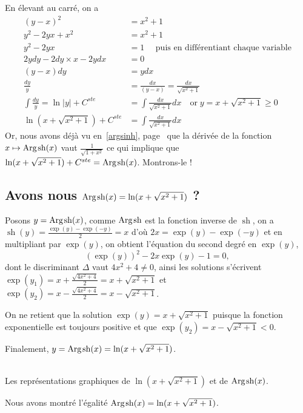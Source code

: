 \documentclass[a4paper,12pt]{report}
\renewcommand{\sinh}{\mathop{\mathrm{sh}}}
\renewcommand{\arg}{\mathop{\mathrm{Arg}}}
\begin{document}
En élevant au carré, on a 
\begin{align*}
(y-x)^2 & = x^2 + 1 \\
y^2 - 2yx + x^2 & = x^2 + 1 \\
y^2 - 2yx  & = 1 \quad \textrm{ puis en différentiant chaque variable} \\
2ydy - 2dy \times x - 2ydx & = 0 \\
(y-x)dy & = ydx \\
\frac{dy}{y} & = \frac{dx}{(y-x)} = \frac{dx}{\sqrt{x^2+1} } \\
\int \frac{dy}{y} = \ln|y| + C^{ste} & = \int \frac{dx}{\sqrt{x^2+1} } dx \quad \textrm{or} \; y = x + \sqrt{x^2+1}  \geqslant 0 \\
\ln(x + \sqrt{x^2+1}) + C^{ste} & = \int \frac{dx}{\sqrt{x^2+1} } dx  
\end{align*}
Or, nous avons déjà vu en~\ref{argsinh}, page~\pageref{argsinh} que la dérivée de la fonction  $x \mapsto \arg\mspace{-1mu}\sinh(x)$  vaut $ \frac{1}{ \sqrt{1+x^2}}$ ce qui implique que $\ln(x + \sqrt{x^2+1}) + C^{ste} = \arg\mspace{-1mu}\sinh\nolimits(x) $. Montrons-le !

\subsection{Avons nous $\arg\mspace{-1mu}\sinh\nolimits(x) = \ln(x + \sqrt{x^2+1}) $ ?}

Posons $ y = \arg\mspace{-1mu}\sinh\nolimits(x) $, comme $ \arg\mspace{-1mu}\sinh\nolimits $ est la fonction inverse de $\sinh$, on a $\sinh(y) = \frac{\exp(y) - \exp(-y)}{2} = x$ d'où $2x = \exp(y) - \exp(-y) $ et en multipliant par $\exp(y)$, on obtient l'équation du second degré en $\exp(y)$,
\begin{equation}
\left(\exp(y) \right)^2 - 2x \exp(y) -1 = 0, 
\end{equation}
dont le discriminant $\Delta$ vaut $4x^2 + 4 \neq 0$, ainsi les solutions s'écrivent $ \exp(y_1) = x + \frac{\sqrt{4x^2 + 4}}{2} = x + \sqrt{x^2+1}$ et $ \exp(y_2) = x - \frac{\sqrt{4x^2 + 4}}{2} = x - \sqrt{x^2+1}$. 

On ne retient que la solution $ \exp(y) = x + \sqrt{x^2+1}$ puisque la fonction exponentielle est toujours positive et que $ \exp(y_2) = x - \sqrt{x^2+1} < 0 $.

Finalement, $y = \arg\mspace{-1mu}\sinh\nolimits(x) = \ln(x + \sqrt{x^2+1})$.


\begin{center}
 \\
Les représentations graphiques de $\ln(x + \sqrt{x^2+1})$ et de $\arg\mspace{-1mu}\sinh\nolimits(x)$.
\end{center}


Nous avons montré l'égalité $\arg\mspace{-1mu}\sinh\nolimits(x) = \ln(x + \sqrt{x^2+1}) $.
\end{document}
